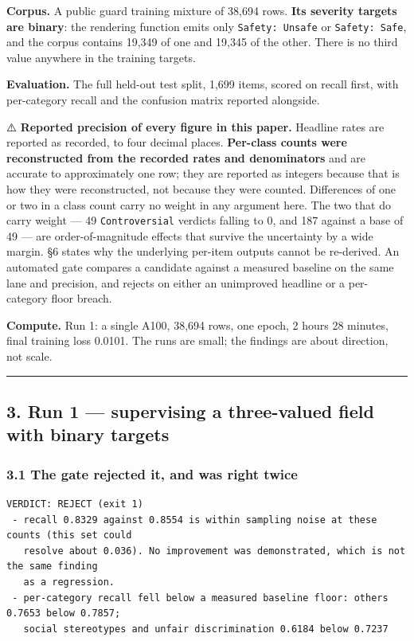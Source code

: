 \textbf{Corpus.} A public guard training mixture of 38,694 rows. \textbf{Its severity targets are binary}: the
rendering function emits only \texttt{Safety:\ Unsafe} or \texttt{Safety:\ Safe}, and the corpus contains 19,349 of
one and 19,345 of the other. There is no third value anywhere in the training targets.

\textbf{Evaluation.} The full held-out test split, 1,699 items, scored on recall first, with per-category
recall and the confusion matrix reported alongside.

⚠️ \textbf{Reported precision of every figure in this paper.} Headline rates are reported as recorded, to
four decimal places. \textbf{Per-class counts were reconstructed from the recorded rates and denominators}
and are accurate to approximately one row; they are reported as integers because that is how they
were reconstructed, not because they were counted. Differences of one or two in a class count carry
no weight in any argument here. The two that do carry weight --- 49 \texttt{Controversial} verdicts falling to
0, and 187 against a base of 49 --- are order-of-magnitude effects that survive the uncertainty by a
wide margin. §6 states why the underlying per-item outputs cannot be re-derived. An automated gate compares a candidate against a
measured baseline on the same lane and precision, and rejects on either an unimproved headline or a
per-category floor breach.

\textbf{Compute.} Run 1: a single A100, 38,694 rows, one epoch, 2 hours 28 minutes, final training loss
0.0101. The runs are small; the findings are about direction, not scale.

\begin{center}\rule{0.5\linewidth}{0.5pt}\end{center}

\subsection{3. Run 1 --- supervising a three-valued field with binary targets}\label{run-1-supervising-a-three-valued-field-with-binary-targets}

\subsubsection{3.1 The gate rejected it, and was right twice}\label{the-gate-rejected-it-and-was-right-twice}

\begin{verbatim}
VERDICT: REJECT (exit 1)
 - recall 0.8329 against 0.8554 is within sampling noise at these counts (this set could
   resolve about 0.036). No improvement was demonstrated, which is not the same finding
   as a regression.
 - per-category recall fell below a measured baseline floor: others 0.7653 below 0.7857;
   social stereotypes and unfair discrimination 0.6184 below 0.7237
\end{verbatim}

